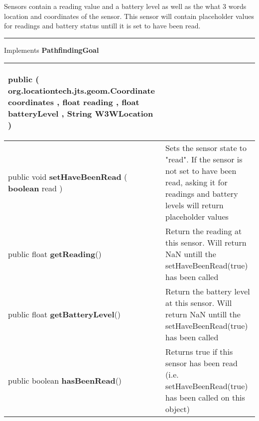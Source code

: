  {\scriptsize Sensors contain a reading value and a battery level as well as the what 3 words location and coordinates of the sensor.\newline%
 This sensor will contain placeholder values for readings and battery status untill it is set to have been read.
 
\vspace*{4pt} \hrule \vspace*{3pt}
Implements \textbf{ PathfindingGoal }
\vspace*{-5pt} 
\begin{tabularx}{\linewidth}{m{}|m{}}
\label{tab:Sensor}
\begin{raggedleft}public  \textbf{\hyperref[tab:Sensor]{\color{blue}{Sensor}} }(\newline \hfill 
\hspace*{ 5pt} \textbf{org.locationtech.jts.geom.Coordinate} coordinates , \newline
 \hspace*{ 5pt} \textbf{float} reading , \newline
 \hspace*{ 5pt} \textbf{float} batteryLevel , \newline
 \hspace*{ 5pt} \textbf{String} W3WLocation  )
\end{raggedleft} &
 \\ \hline 
\begin{raggedleft}public void \textbf{setHaveBeenRead }(\hspace*{ 5pt} \textbf{boolean} read  )
\end{raggedleft} &
 Sets the sensor state to "read". If the sensor is not set to have been read, asking it for readings and battery levels will return placeholder values\\ \hline 
\begin{raggedleft}public float \textbf{getReading}()
\end{raggedleft} &
 Return the reading at this sensor. Will return NaN untill the setHaveBeenRead(true) has been called\\ \hline 
\begin{raggedleft}public float \textbf{getBatteryLevel}()
\end{raggedleft} &
 Return the battery level at this sensor. Will return NaN untill the setHaveBeenRead(true) has been called\\ \hline 
\begin{raggedleft}public boolean \textbf{hasBeenRead}()
\end{raggedleft} &
 Returns true if this sensor has been read (i.e. setHaveBeenRead(true) has been called on this object)\\\end{tabularx}
}
